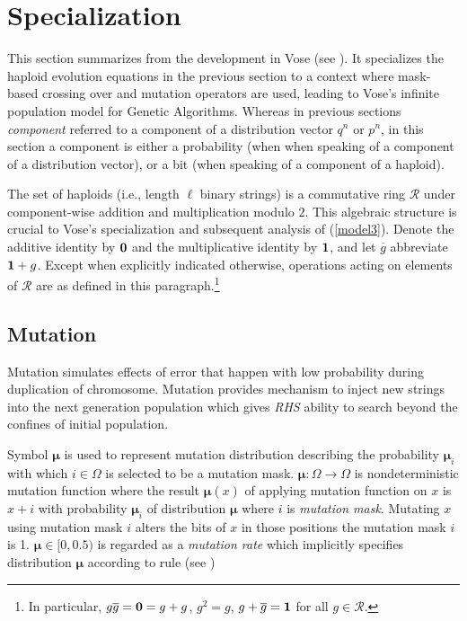 \section{Specialization}\label{specialize}
This section summarizes from the development in Vose (see \cite{Vose1999}).
It specializes the haploid evolution equations in the previous section 
to a context where mask-based crossing over and mutation operators are used, 
leading to Vose's infinite population model for Genetic Algorithms.  Whereas 
in previous sections {\em component} referred to a component
of a distribution vector $q^n$ or $p^n$, in this section a component
is either a probability (when when speaking of a component of a
distribution vector), or a bit (when speaking of a component of a
haploid).

The set of haploids (i.e., length $\ell$ binary strings) is a
commutative ring $\mathcal{R}$ under component-wise addition and
multiplication modulo $2$.  This algebraic structure is crucial to
Vose's specialization and subsequent analysis of
(\ref{model3}). Denote the additive identity by ${\bf 0}$ and the
multiplicative identity by ${\bf 1}$, and let $\overline{g}$
abbreviate ${\bf 1} + g$.  Except when explicitly indicated otherwise,
operations acting on elements of $\mathcal{R}$ are as defined in this
paragraph.\footnote{In particular, $g \overline{g} = {\bf 0} = g+g$,
  $g^2 = g$, $g + \overline{g} = {\bf 1}$ for all $g \in
  \mathcal{R}$.}

\subsection{Mutation}
Mutation simulates effects of error that happen with low probability during duplication of chromosome. Mutation provides mechanism to inject new strings into the next generation population which gives {\em RHS} ability to search beyond the confines of initial population.

Symbol $\bm{\mu}$ is used to represent mutation distribution describing the probability $\bm{\mu}_i$ with which $i \in \Omega$ is selected to be a mutation mask. $\bm{\mu} : \Omega \rightarrow \Omega$ is nondeterministic mutation function where the result $\bm{\mu}(x)$ of applying mutation function on $x$ is $x + i$ with probability $\bm{\mu}_i$ of distribution $\bm{\mu}$ where $i$ is {\em mutation mask}. Mutating $x$ using mutation mask $i$ alters the bits of $x$ in those positions the mutation mask $i$ is 1.
$\bm{\mu} \in [0, 0.5)$ is regarded as a {\em mutation rate} which implicitly specifies distribution $\bm{\mu}$ according to rule (see \cite{VoseWright1998})

